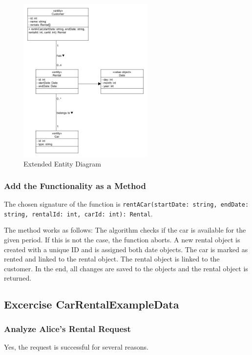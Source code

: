 \begin{figure}[H]
    \centering
    \includegraphics[width=0.6\textwidth]{figures/goLang/carRental/carRental_extendedEntity.png}
    \caption{Extended Entity Diagram}
    \label{fig:extendedEntityDiagram}
\end{figure}

\subsubsection*{Add the Functionality as a Method}
The chosen signature of the function is \texttt{rentACar(startDate: string, endDate: string, rentalId: int, carId: int): Rental}.

The method works as follows:
The algorithm checks if the car is available for the given period.
If this is not the case, the function aborts.
A new rental object is created with a unique ID and is assigned both date objects.
The car is marked as rented and linked to the rental object.
The rental object is linked to the customer.
In the end, all changes are saved to the objects and the rental object is returned.

\subsection{Excercise CarRentalExampleData}
\label{sec:exercise_car_rental_example_data}
\subsubsection*{Analyze Alice's Rental Request}
Yes, the request is successful for several reasons.

